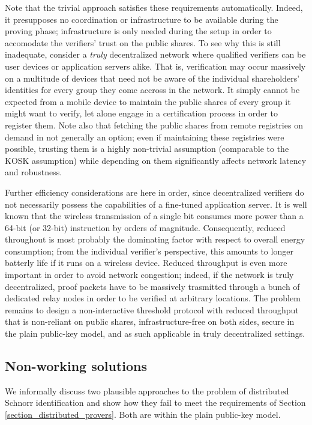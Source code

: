 \documentclass[psamsfonts, reqno]{amsart}
\theoremstyle{definition}
\theoremstyle{remark}
\numberwithin{equation}{section}
\begin{document}
Note that the trivial approach satisfies
these requirements automatically.
Indeed, it presupposes no coordination or infrastructure
to be available during the proving phase;
infrastructure is only needed during
the setup in order to accomodate
the verifiers' trust on the public shares.
To see why this is still inadequate,
consider a \textit{truly} decentralized network
where qualified verifiers can be user devices
or application servers alike.
That is, verification may occur massively
on a multitude of devices that need not be aware
of the individual shareholders' identities for every group
they come accross in the network.
It simply cannot be expected from a mobile device
to maintain the public shares of every group
it might want to verify,
let alone engage in a certification process
in order to register them.
Note also that fetching the public shares
from remote registries on demand in not generally an option;
even if maintaining these registries were possible,
trusting them is a highly non-trivial assumption
(comparable to the KOSK assumption)
while depending on them significantly affects
network latency and robustness.

Further efficiency considerations are here in order,
since decentralized verifiers do not necessarily possess
the capabilities of a fine-tuned application server.
It is well known that the wireless transmission
of a single bit consumes more power
than a 64-bit (or 32-bit) instruction by orders of magnitude.
Consequently, reduced throughout is
most probably the dominating factor
with respect to overall energy consumption;
from the individual verifier's perspective,
this amounts to longer batterly life
if it runs on a wireless device.
Reduced throughput is even more important
in order to avoid network congestion; indeed,
if the network is truly decentralized,
proof packets have to be massively trasmitted
through a bunch of dedicated relay nodes
in order to be verified at arbitrary locations.
The problem remains to
design a non-interactive threshold protocol
with reduced throughput that is
non-reliant on public shares, infrastructure-free
on both sides, secure in the plain public-key model,
and as such applicable in truly decentralized settings.



\subsection{Non-working solutions}\label{section_non_working_solutions}

We informally discuss two plausible approaches to the
problem of distributed Schnorr identification
and show how they fail to meet
the requirements of
Section \ref{section_distributed_provers}.
Both are within the plain public-key model.
\end{document}
